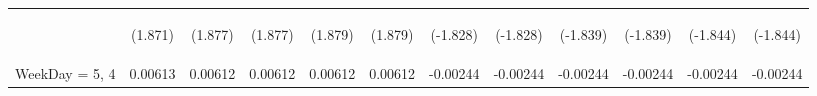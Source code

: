 \documentclass[]{article}
\begin{document}
\begin{center}
\begin{tabular}{lccccccccccc}
        \vspace{4pt}     & \begin{footnotesize}(1.871)\end{footnotesize}  & \begin{footnotesize}(1.877)\end{footnotesize}  & \begin{footnotesize}(1.877)\end{footnotesize}  & \begin{footnotesize}(1.879)\end{footnotesize}  & \begin{footnotesize}(1.879)\end{footnotesize}  & \begin{footnotesize}(-1.828)\end{footnotesize}  & \begin{footnotesize}(-1.828)\end{footnotesize}  & \begin{footnotesize}(-1.839)\end{footnotesize} & \begin{footnotesize}(-1.839)\end{footnotesize} & \begin{footnotesize}(-1.844)\end{footnotesize} & \begin{footnotesize}(-1.844)\end{footnotesize} \\
        WeekDay = 5, 4   & 0.00613                                        & 0.00612                                        & 0.00612                                        & 0.00612                                        & 0.00612                                        & -0.00244                                        & -0.00244                                        & -0.00244                                       & -0.00244                                       & -0.00244                                       & -0.00244                                       \\

\end{tabular}
\end{center}
\end{document}
